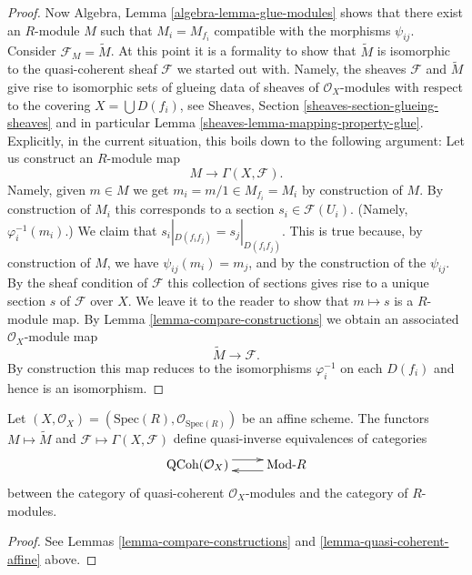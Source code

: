 \begin{proof}
\medskip\noindent
Now Algebra, Lemma \ref{algebra-lemma-glue-modules}
shows that there exist an $R$-module $M$ such that
$M_i = M_{f_i}$ compatible with the morphisms $\psi_{ij}$.
Consider $\mathcal{F}_M = \widetilde M$. At this point it is
a formality to show that $\widetilde M$ is isomorphic to
the quasi-coherent sheaf $\mathcal{F}$ we started out with.
Namely, the sheaves $\mathcal{F}$ and $\widetilde M$ give
rise to isomorphic sets of glueing data of sheaves of $\mathcal{O}_X$-modules
with respect to the covering $X = \bigcup D(f_i)$, see
Sheaves, Section \ref{sheaves-section-glueing-sheaves}
and in particular Lemma \ref{sheaves-lemma-mapping-property-glue}.
Explicitly, in the current situation, this boils down to
the following argument: Let us construct an $R$-module map
$$
M \longrightarrow \Gamma(X, \mathcal{F}).
$$
Namely, given $m \in M$ we get $m_i = m/1 \in M_{f_i} = M_i$
by construction of $M$. By construction of $M_i$ this corresponds
to a section $s_i \in \mathcal{F}(U_i)$. (Namely, $\varphi^{-1}_i(m_i)$.)
We claim that $s_i|_{D(f_if_j)} = s_j|_{D(f_if_j)}$. This is
true because, by construction of $M$, we have $\psi_{ij}(m_i) = m_j$,
and by the construction of the $\psi_{ij}$. By the sheaf condition of
$\mathcal{F}$ this collection of sections gives rise to a unique
section $s$ of $\mathcal{F}$ over $X$. We leave it to the reader
to show that $m \mapsto s$ is a $R$-module map.
By Lemma \ref{lemma-compare-constructions} we obtain an associated
$\mathcal{O}_X$-module map
$$
\widetilde M \longrightarrow \mathcal{F}.
$$
By construction this map reduces to the isomorphisms
$\varphi_i^{-1}$ on each $D(f_i)$ and hence is an isomorphism.
\end{proof}

\begin{lemma}
\label{lemma-equivalence-quasi-coherent}
Let $(X, \mathcal{O}_X) = (\text{Spec}(R), \mathcal{O}_{\text{Spec}(R)})$
be an affine scheme.
The functors $M \mapsto \widetilde M$ and 
$\mathcal{F} \mapsto \Gamma(X, \mathcal{F})$ define quasi-inverse
equivalences of categories
$$
\xymatrix{
\text{QCoh}(\mathcal{O}_X)
\ar@<1ex>[r]
&
\text{Mod-}R
\ar@<1ex>[l]
}
$$
between the category of quasi-coherent $\mathcal{O}_X$-modules
and the category of $R$-modules.
\end{lemma}

\begin{proof}
See Lemmas \ref{lemma-compare-constructions}
and \ref{lemma-quasi-coherent-affine} above.
\end{proof}

